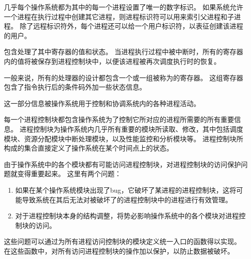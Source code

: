 {{        
        {
            几乎每个操作系统都为其中的每一个进程设置了唯一的数字标识。
            如果系统允许一个进程在执行过程中创建其它进程，则进程标识符可以用来索引父进程和子进程。
            除了远程标识符外，每个进程还可以给一个用户标识符，以表征创建该进程的用户。
        }

        {
            包含处理了其中寄存器的值和状态。
            当进程执行过程中被中断时，所有的寄存器内的值将被保存到进程控制块中，以便该进程被再次调度执行时的恢复。

            一般来说，所有的处理器的设计都包含一个或一组被称为的寄存器。
            这组寄存器包含了指令执行后的条件码外加一些状态信息。
        }

        {
            这一部分信息被操作系统用于控制和协调系统内的各种进程活动。
        }

        {
            每一个进程控制块都包含操作系统为了控制它所对应的进程所需要的所有重要信息。
            进程控制块为操作系统内几乎所有重要的模块所读取、修改，其中包括调度模块、资源分配模块中断处理模块，以及性能监控和分析模块等。
            进程控制块所构成的集合直接定义了操作系统在某个时间点上的状态。

            由于操作系统中的各个模块都有可能访问进程控制块，对进程控制块的访问保护问题就变得重要起来。
            这里有两个问题：

            \begin{enumerate}
                \item 如果在某个操作系统模块出现了bug，它破坏了某进程的进程控制块，这将可能导致系统在其后无法对被破坏了的进程控制块中的进程进行有效管理。
                \item 对于进程控制块本身的结构调整，将势必影响操作系统中的各个模块对进程控制块的访问。
            \end{enumerate}

            这些问题可以通过为所有进程访问控制块的模块定义统一入口的函数得以实现。
            在这些函数中，对所有访问进程控制块的操作加以保护，以防止数据被破坏。
        }
    }
}
